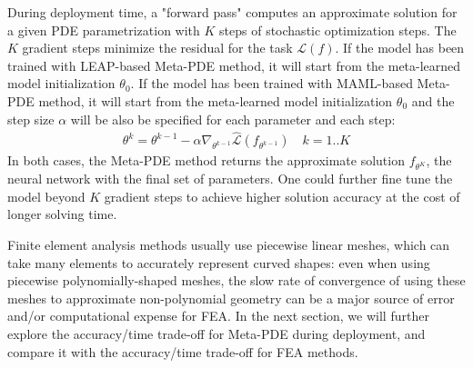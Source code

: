 During deployment time, a "forward pass" computes an approximate solution for a given PDE parametrization with $K$ steps of stochastic optimization steps. The $K$ gradient steps minimize the residual for the task $\mathcal{L}(f)$. If the model has been trained with LEAP-based Meta-PDE method, it will start from the meta-learned model initialization $\theta_0$. If the model has been trained with MAML-based Meta-PDE method, it will start from the meta-learned model initialization $\theta_0$ and the step size $\alpha$ will be also be specified for each parameter and each step: 
\begin{align}
  \theta^k = \theta^{k-1} - \alpha \nabla_{\theta^{k-1}} \hat{\mathcal{L}}(f_{\theta^{k-1}}) \quad k = 1 .. K
\end{align}
In both cases, the Meta-PDE method returns the approximate solution $f_{\theta^K}$, the neural network with the final set of parameters. One could further fine tune the model beyond $K$ gradient steps to achieve higher solution accuracy at the cost of longer solving time. 

Finite element analysis methods usually use piecewise linear meshes, which can take many elements to accurately represent curved shapes: even when using piecewise polynomially-shaped meshes, the slow rate of convergence of using these meshes to approximate non-polynomial geometry can be a major source of error and/or computational expense for FEA. In the next section, we will further explore the accuracy/time trade-off for Meta-PDE during deployment, and compare it with the accuracy/time trade-off for FEA methods. 

